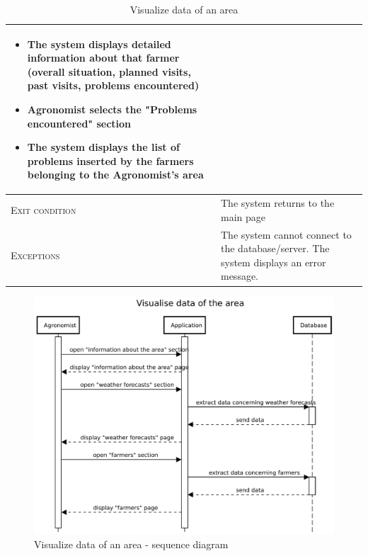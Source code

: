 \begin{table}[H]
\begin{tabular}[c]{|l|p{}|}
\begin{itemize}
                                    		\item The system displays detailed information about that farmer (overall situation, planned visits, past visits, problems encountered)
                                    		\item Agronomist selects the "Problems encountered" section
                                    		\item The system displays the list of problems inserted by the farmers belonging to the Agronomist's area
                                        \end{itemize}\\
        \hline %
        \textsc{Exit condition}    &  The system returns to the main page\\
    	\hline %
    	\textsc{Exceptions}         &  The system cannot connect to the database/server. The system displays an error message.
    	\\
    	\hline %
        
    \end{tabular}
    \caption{\label{tab:Area_information_access}Visualize data of an area}
\end{table}

\begin{figure}[H]
    \centering
    \includegraphics[scale=0.65]{Images/Sequence diagrams/Agronomist - visualise data of the area.pdf}

    \caption{Visualize data of an area - sequence diagram}
    \label{fig:fig:seq_diag_visualize_area}
\end{figure}


